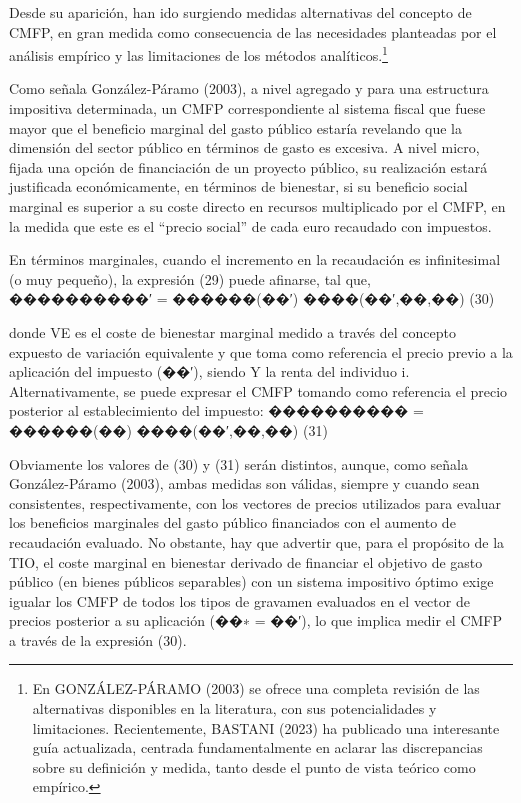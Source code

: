 \documentclass[10pt,a4paper]{article}
\begin{document}
Desde su aparición, han ido surgiendo medidas alternativas del concepto de CMFP, en gran medida como consecuencia de las necesidades planteadas por el análisis empírico y las limitaciones de los métodos analíticos.\footnote{%
    En GONZÁLEZ-PÁRAMO (2003) se ofrece una completa revisión de las alternativas disponibles en la literatura, con sus potencialidades y limitaciones. Recientemente, BASTANI (2023) ha publicado una interesante guía actualizada, centrada fundamentalmente en aclarar las discrepancias sobre su definición y medida, tanto desde el punto de vista teórico como empírico.
}

Como señala González-Páramo (2003), a nivel agregado y para una estructura impositiva determinada, un CMFP correspondiente al sistema fiscal que fuese mayor que el beneficio marginal del gasto público estaría revelando que la dimensión del sector público en términos de gasto es excesiva. A nivel micro, fijada una opción de financiación de un proyecto público, su realización estará justificada económicamente, en términos de bienestar, si su beneficio social marginal es superior a su coste directo en recursos multiplicado por el CMFP, en la medida que este es el “precio social” de cada euro recaudado con impuestos.

En términos marginales, cuando el incremento en la recaudación es infinitesimal (o muy pequeño), la expresión (29) puede afinarse, tal que,
����������′ =
������(��′)
����(��′,��,��)
(30)

donde VE es el coste de bienestar marginal medido a través del concepto expuesto de variación equivalente y que toma como referencia el precio previo a la aplicación del impuesto (��′), siendo Y la renta del individuo i. Alternativamente, se puede expresar el CMFP tomando como referencia el precio posterior al establecimiento del impuesto:
���������� =
������(��)
����(��′,��,��)
(31)

Obviamente los valores de (30) y (31) serán distintos, aunque, como señala González-Páramo (2003), ambas medidas son válidas, siempre y cuando sean consistentes, respectivamente, con los vectores de precios utilizados para evaluar los beneficios marginales del gasto público financiados con el aumento de recaudación evaluado. No obstante, hay que advertir que, para el propósito de la TIO, el coste marginal en bienestar derivado de financiar el objetivo de gasto público (en bienes públicos separables) con un sistema impositivo óptimo exige igualar los CMFP de todos los tipos de gravamen evaluados en el vector de precios posterior a su aplicación (��∗ = ��′), lo que implica medir el CMFP a través de la expresión (30).
\end{document}
